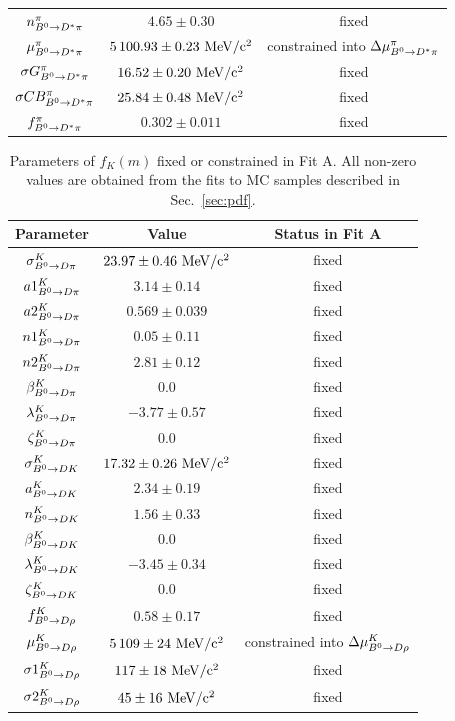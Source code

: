 \begin{table}
\begin{center}
\begin{tabular}{ccc}
			$n^{\pi}_{B^0\rightarrow D^*\pi}$ & $4.65\pm0.30$ & fixed\\
			$\mu^{\pi}_{B^0\rightarrow D^*\pi}$ & $5\,100.93\pm0.23~\rm MeV/c^{2}$ & constrained into $\Delta\mu^{\pi}_{B^0\rightarrow D^*\pi}$\\
			$\sigma G^{\pi}_{B^0\rightarrow D^*\pi}$ & $16.52\pm0.20~\rm MeV/c^{2}$ & fixed\\
			$\sigma CB^{\pi}_{B^0\rightarrow D^*\pi}$ & $25.84\pm0.48~\rm MeV/c^{2}$ & fixed\\
			$f^{\pi}_{B^0\rightarrow D^*\pi}$ & $0.302\pm0.011$ & fixed\\
			\bottomrule
		\end{tabular}
		\label{tab:FitAfixedPisample}
	\end{center}
\end{table}
\begin{table}
	\begin{center}
		\caption{Parameters of $f_{K}(m)$ fixed or constrained in Fit A. All non-zero values are obtained
		from the fits to MC samples described in Sec.~\ref{sec:pdf}.}
		\begin{tabular}{ccc}
			\toprule
			Parameter & Value & Status in Fit A\\
			\hline
			$\sigma^{K}_{B^0\rightarrow D\pi}$ & $23.97\pm0.46~\rm MeV/c^{2}$ & fixed\\
			$a1^{K}_{B^0\rightarrow D\pi}$ & $3.14\pm0.14$ & fixed\\
			$a2^{K}_{B^0\rightarrow D\pi}$ & $0.569\pm0.039$ & fixed\\
			$n1^{K}_{B^0\rightarrow D\pi}$ & $0.05\pm0.11$ & fixed\\
			$n2^{K}_{B^0\rightarrow D\pi}$ & $2.81\pm0.12$ & fixed\\
			$\beta^{K}_{B^0\rightarrow D\pi}$ & $0.0$ & fixed\\
			$\lambda^{K}_{B^0\rightarrow D\pi}$ & $-3.77\pm0.57$ & fixed\\
			$\zeta^{K}_{B^0\rightarrow D\pi}$ & $0.0$ & fixed\\
			\hline
			$\sigma^{K}_{B^0\rightarrow DK}$ & $17.32\pm0.26~\rm MeV/c^{2}$ & fixed\\
			$a^{K}_{B^0\rightarrow DK}$ & $2.34\pm0.19$ & fixed\\
			$n^{K}_{B^0\rightarrow DK}$ & $1.56\pm0.33$ & fixed\\
			$\beta^{K}_{B^0\rightarrow DK}$ & $0.0$ & fixed\\
			$\lambda^{K}_{B^0\rightarrow DK}$ & $-3.45\pm0.34$ & fixed\\
			$\zeta^{K}_{B^0\rightarrow DK}$ & $0.0$ & fixed\\
			\hline
			$f^{K}_{B^0\rightarrow D\rho}$ & $0.58\pm0.17$ & fixed\\
			$\mu^{K}_{B^0\rightarrow D\rho}$ & $5\,109\pm24~\rm MeV/c^{2}$ & constrained into $\Delta\mu^{K}_{B^0\rightarrow D\rho}$\\
			$\sigma 1^{K}_{B^0\rightarrow D\rho}$ & $117\pm18~\rm MeV/c^{2}$ & fixed\\
			$\sigma 2^{K}_{B^0\rightarrow D\rho}$ & $45\pm16~\rm MeV/c^{2}$ & fixed\\
			\bottomrule
		\end{tabular}
		\label{tab:FitAfixedKsample}
	\end{center}
\end{table}
